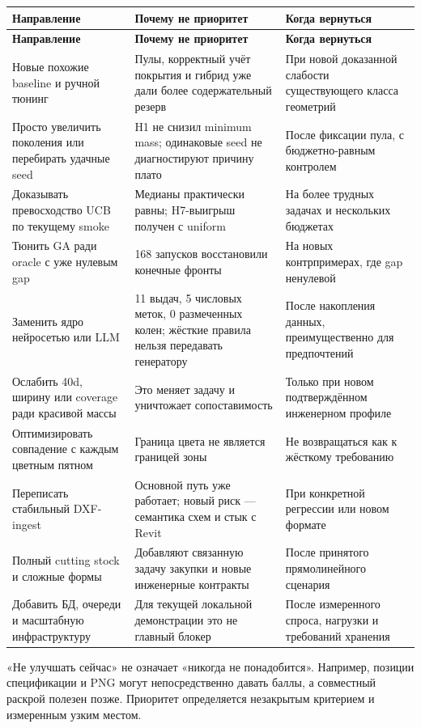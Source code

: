 \documentclass[11pt,a4paper]{article}
\begin{document}
{\small\setlength{\tabcolsep}{4pt}
\begin{longtable}{@{}L{41.178mm}L{63.351mm}L{53.848mm}@{}}
\toprule
\textbf{Направление} & \textbf{Почему не приоритет} & \textbf{Когда вернуться} \\
\midrule\endfirsthead
\toprule
\textbf{Направление} & \textbf{Почему не приоритет} & \textbf{Когда вернуться} \\
\midrule\endhead
\bottomrule\endfoot
Новые похожие baseline и ручной тюнинг & Пулы, корректный учёт покрытия и гибрид уже дали более содержательный резерв & При новой доказанной слабости существующего класса геометрий \\
Просто увеличить поколения или перебирать удачные seed & H1 не снизил minimum mass; одинаковые seed не диагностируют причину плато & После фиксации пула, с бюджетно-равным контролем \\
Доказывать превосходство UCB по текущему smoke & Медианы практически равны; H7-выигрыш получен с uniform & На более трудных задачах и нескольких бюджетах \\
Тюнить GA ради oracle с уже нулевым gap & 168 запусков восстановили конечные фронты & На новых контрпримерах, где gap ненулевой \\
Заменить ядро нейросетью или LLM & 11 выдач, 5 числовых меток, 0 размеченных колен; жёсткие правила нельзя передавать генератору & После накопления данных, преимущественно для предпочтений \\
Ослабить 40d, ширину или coverage ради красивой массы & Это меняет задачу и уничтожает сопоставимость & Только при новом подтверждённом инженерном профиле \\
Оптимизировать совпадение с каждым цветным пятном & Граница цвета не является границей зоны & Не возвращаться как к жёсткому требованию \\
Переписать стабильный DXF-ingest & Основной путь уже работает; новый риск — семантика схем и стык с Revit & При конкретной регрессии или новом формате \\
Полный cutting stock и сложные формы & Добавляют связанную задачу закупки и новые инженерные контракты & После принятого прямолинейного сценария \\
Добавить БД, очереди и масштабную инфраструктуру & Для текущей локальной демонстрации это не главный блокер & После измеренного спроса, нагрузки и требований хранения \\
\end{longtable}}

«Не улучшать сейчас» не означает «никогда не понадобится». Например, позиции спецификации и PNG могут непосредственно давать баллы, а совместный раскрой полезен позже. Приоритет определяется незакрытым критерием и измеренным узким местом.
\end{document}
